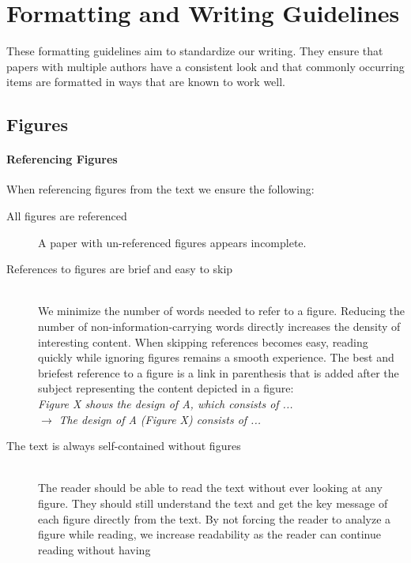 \documentclass[conference]{IEEEtran}
\newenvironment{draftonly}{}{}
\begin{document}
\newpage
\appendix
\begin{draftonly}
\section{Formatting and Writing Guidelines}

These formatting guidelines aim to standardize our writing. They ensure that
papers with multiple authors have a consistent look and that commonly occurring
items are formatted in ways that are known to work well.

\subsection{Figures}

\paragraph{Referencing Figures} When referencing figures from the text we
ensure the following:
\begin{description}
      \item [All figures are referenced] A paper with un-referenced figures
	      appears incomplete.
      \item [References to figures are brief and easy to skip]~\\
                We minimize the number of words needed to refer to a figure. Reducing
                the number of non-information-carrying words directly increases
		the density of interesting content. When skipping references
		becomes easy, reading quickly while ignoring figures remains a
		smooth experience. The best and briefest reference to a figure
		is a link in parenthesis that is added after the subject
		representing the content depicted in a figure:\\
		{\color{pairedTwoDarkBlue}\textit{Figure
		X shows the design of A, which consists of ...}}\\
		$\to$ {\color{pairedFourDarkGreen}
		\textit{The design of A (Figure X) consists of ...}}
      \item [The text is always self-contained without figures] ~\\ The reader
                should be able to read the text without ever looking at any
                figure. They should still understand the text and get the key
		message of each figure directly from the text. By not forcing
		the reader to analyze a figure while reading, we increase
		readability as the reader can continue reading without having

\end{description}
\end{draftonly}
\end{document}
